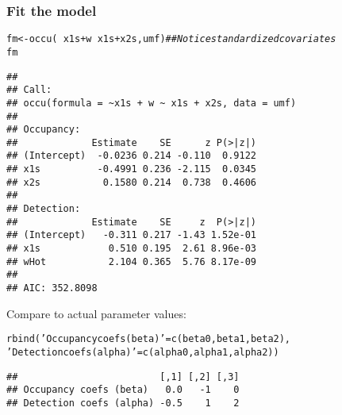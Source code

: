 \documentclass[color=usenames,dvipsnames]{beamer}\usepackage[]{graphicx}\usepackage[]{xcolor}
\makeatletter
\newcommand{\hlstr}[1]{\textcolor[rgb]{0.749,0.012,0.012}{#1}}%
\newcommand{\hlcom}[1]{\textcolor[rgb]{0.514,0.506,0.514}{\textit{#1}}}%
\newcommand{\hlopt}[1]{\textcolor[rgb]{0,0,0}{#1}}%
\newcommand{\hlstd}[1]{\textcolor[rgb]{0,0,0}{#1}}%
\newcommand{\hlkwb}[1]{\textcolor[rgb]{0,0.341,0.682}{#1}}%
\newcommand{\hlkwd}[1]{\textcolor[rgb]{0.004,0.004,0.506}{#1}}%
\newenvironment{kframe}{%
 \def\at@end@of@kframe{}%
 \ifinner\ifhmode%
  \def\at@end@of@kframe{\end{minipage}}%
  \begin{minipage}{\columnwidth}%
 \fi\fi%
 \def\FrameCommand##1{\hskip\@totalleftmargin \hskip-\fboxsep
 \colorbox{shadecolor}{##1}\hskip-\fboxsep
     \hskip-\linewidth \hskip-\@totalleftmargin \hskip\columnwidth}%
 \MakeFramed {\advance\hsize-\width
   \@totalleftmargin\z@ \linewidth\hsize
   \@setminipage}}%
 {\par\unskip\endMakeFramed%
 \at@end@of@kframe}
\newenvironment{knitrout}{}{} %
\makeatother
\begin{document}
\begin{frame}[fragile]
  \frametitle{Fit the model}
  \footnotesize
\begin{knitrout}\tiny
{}\color{fgcolor}\begin{kframe}
\begin{alltt}
\hlstd{fm} \hlkwb{<-} \hlkwd{occu}\hlstd{(}\hlopt{~}\hlstd{x1s}\hlopt{+}\hlstd{w} \hlopt{~}\hlstd{x1s}\hlopt{+}\hlstd{x2s, umf)}    \hlcom{## Notice standardized covariates}
\hlstd{fm}
\end{alltt}
\begin{verbatim}
## 
## Call:
## occu(formula = ~x1s + w ~ x1s + x2s, data = umf)
## 
## Occupancy:
##             Estimate    SE      z P(>|z|)
## (Intercept)  -0.0236 0.214 -0.110  0.9122
## x1s          -0.4991 0.236 -2.115  0.0345
## x2s           0.1580 0.214  0.738  0.4606
## 
## Detection:
##             Estimate    SE     z  P(>|z|)
## (Intercept)   -0.311 0.217 -1.43 1.52e-01
## x1s            0.510 0.195  2.61 8.96e-03
## wHot           2.104 0.365  5.76 8.17e-09
## 
## AIC: 352.8098
\end{verbatim}
\end{kframe}
\end{knitrout}
\pause
\vfill
Compare to actual parameter values:
\begin{knitrout}\tiny
{}\color{fgcolor}\begin{kframe}
\begin{alltt}
\hlkwd{rbind}\hlstd{(}\hlstr{'Occupancy coefs (beta)'}\hlstd{=}\hlkwd{c}\hlstd{(beta0, beta1, beta2),}
      \hlstr{'Detection coefs (alpha)'}\hlstd{=}\hlkwd{c}\hlstd{(alpha0, alpha1, alpha2))}
\end{alltt}
\begin{verbatim}
##                         [,1] [,2] [,3]
## Occupancy coefs (beta)   0.0   -1    0
## Detection coefs (alpha) -0.5    1    2
\end{verbatim}
\end{kframe}
\end{knitrout}
\end{frame}
\end{document}
